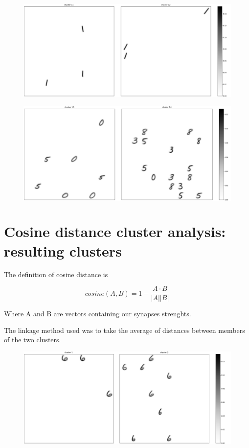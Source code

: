 \documentclass[a4paper]{report}
\begin{document}
\begin{figure} [H]
    \centering
    \includegraphics [width=\textwidth ] {c/e/11.png}
    \caption{}
\end{figure}

\begin{figure} [H]
    \centering
    \includegraphics [width=\textwidth ] {c/e/13.png}
    \caption{}
\end{figure}

\chapter{Cosine distance cluster analysis: resulting clusters}

The definition of cosine distance is

\begin{equation}
    cosine(A,B) = 1 - \frac{A \cdot B}{|A||B|}
\end{equation}

Where A and B are vectors containing our synapses strenghts.

The linkage method used was to take the average of distances between members of the two clusters.

\begin{figure} [H]
    \centering
    \includegraphics [width=\textwidth ] {c/c/1.png}
    \caption{}
\end{figure}
\end{document}
